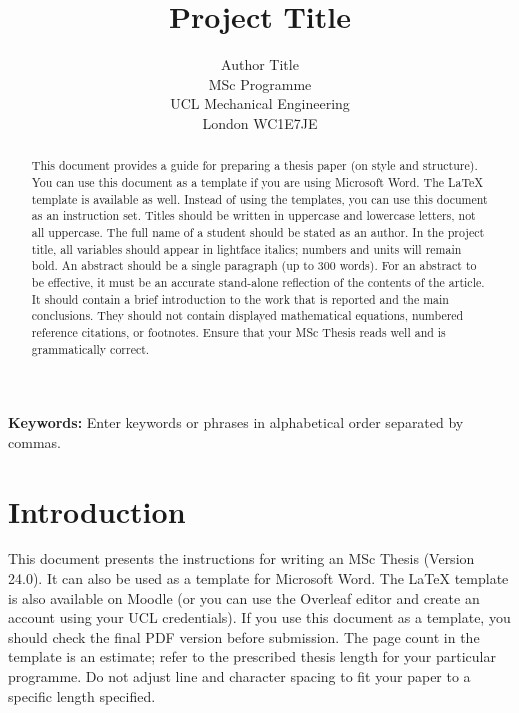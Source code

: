 \documentclass[11pt,a4paper]{article}
\title{Project Title}
\author{Author Title\\
        MSc Programme\\
        UCL Mechanical Engineering\\
        London WC1E7JE}
\begin{document}
\maketitle

\begin{abstract}
This document provides a guide for preparing a thesis paper (on style and structure). You can use this document as a template if you are using Microsoft Word. The LaTeX template is available as well. Instead of using the templates, you can use this document as an instruction set. Titles should be written in uppercase and lowercase letters, not all uppercase. The full name of a student should be stated as an author. In the project title, all variables should appear in lightface italics; numbers and units will remain bold. An abstract should be a single paragraph (up to 300 words). For an abstract to be effective, it must be an accurate stand-alone reflection of the contents of the article. It should contain a brief introduction to the work that is reported and the main conclusions. They should not contain displayed mathematical equations, numbered reference citations, or footnotes. Ensure that your MSc Thesis reads well and is grammatically correct.
\end{abstract}

\textbf{Keywords:} Enter keywords or phrases in alphabetical order separated by commas.

\pagestyle{fancy}
\renewcommand{\headrulewidth}{0pt}
\renewcommand{\footrulewidth}{0pt}

\section{Introduction}
This document presents the instructions for writing an MSc Thesis (Version 24.0). It can also be used as a template for Microsoft Word. The LaTeX template is also available on Moodle (or you can use the Overleaf editor and create an account using your UCL credentials). If you use this document as a template, you should check the final PDF version before submission. The page count in the template is an estimate; refer to the prescribed thesis length for your particular programme. Do not adjust line and character spacing to fit your paper to a specific length specified.
\end{document}

